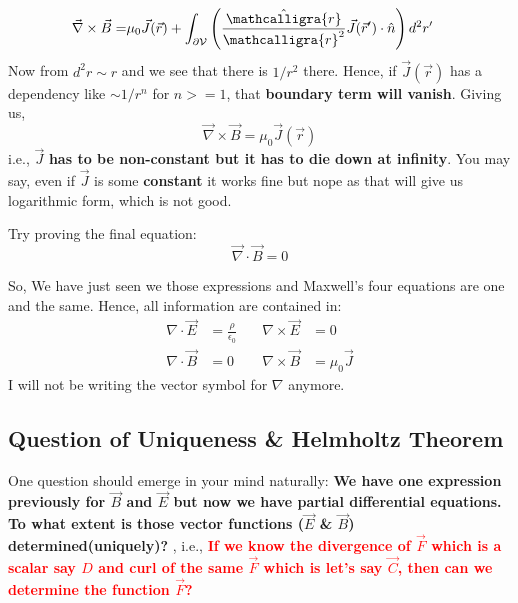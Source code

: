 \documentclass{article}
\newcommand{\scriptr}{\mathord{\mathcalligra{r}}}
\begin{document}
\begin{equation}
        \begin{split}
            \vec{\nabla}\times \vec{B} = &  \mu_0 \vec{J}(\vec{r}) + \int_{\partial \mathcal{V}}\Bigg( \frac{\hat{\scriptr}}{\scriptr^2}\vec{J}(\vec{r}')\cdot \hat{n} \Bigg)\, d^2r'
        \end{split}
\end{equation}
Now from $d^2r\sim r$ and we see that there is $1/r^2$ there. Hence, if $\vec{J}(\vec{r})$ has a dependency like $\sim 1/r^n$ for $n>=1$, that \textbf{boundary term will vanish}. Giving us,
\begin{equation}
    \vec{\nabla}\times \vec{B} =  \mu_0 \vec{J}(\vec{r})
    \label{Bcurl_1}
\end{equation}
i.e., $\vec{J}$\textbf{ has to be non-constant but it has to die down at infinity}. You may say, even if $\vec{J}$ is some \textbf{constant} it works fine but nope as that will give us logarithmic form, which is not good.

Try proving the final equation:
\begin{equation}
    \vec{\nabla}\cdot \vec{B} = 0
    \label{div_B}
\end{equation}

So, We have just seen we those expressions and Maxwell's four equations are one and the same. Hence, all information are contained in:
\begin{equation}
\begin{aligned}
\nabla \cdot \vec{E} & = \frac{\rho}{\epsilon_0} 
& \quad \nabla \times \vec{E} & = 0 \\[6pt]
\nabla \cdot \vec{B} & = 0 
& \quad \nabla \times \vec{B} & = \mu_0 \vec{J}
\end{aligned}
\label{maxstat}
\end{equation}
I will not be writing the vector symbol for $\nabla$ anymore. 

\subsection{Question of Uniqueness \& Helmholtz Theorem}
One question should emerge in your mind naturally: \textbf{We have one expression previously for $\vec{B}$ and $\vec{E}$ but now we have partial differential equations. To what extent is those vector functions ($\vec{E}$ \& $\vec{B}$) determined(uniquely)?} , i.e., \textcolor{red}{\textbf{If we know the divergence of $\vec{F}$ which is a scalar say $D$ and curl of the same $\vec{F}$ which is let's say $\vec{C}$, then can we determine the function $\vec{F}$?}}
\end{document}
